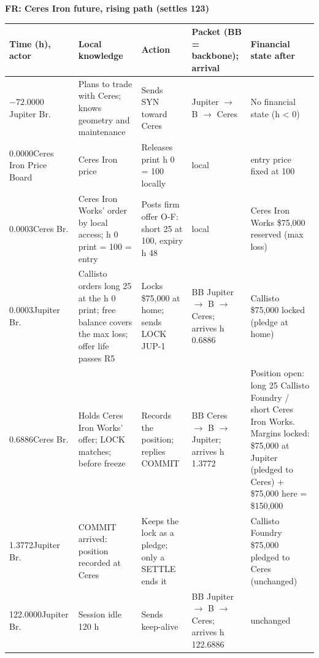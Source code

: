 \medskip
\par\noindent\textbf{FR: Ceres Iron future, rising path (settles 123)}\par
{\setlength{\tabcolsep}{3pt}
\begin{xltabular}{\linewidth}{>{\raggedright\arraybackslash}p{1.75cm}>{\raggedright\arraybackslash{}\hsize}X>{\raggedright\arraybackslash{}\hsize}X>{\raggedright\arraybackslash{}\hsize}X>{\raggedright\arraybackslash{}\hsize}X}
\toprule
Time (h), actor & Local knowledge & Action & Packet (BB = backbone); arrival & Financial state after\\
\midrule
\endhead
\bottomrule
\endlastfoot
\mbox{$-72.0000$}\newline Jupiter Br. & Plans to trade with Ceres; knows geometry and maintenance & Sends SYN toward Ceres & Jupiter $\to$ B $\to$ Ceres & No financial state (h < 0)\\
\mbox{0.0000}\newline Ceres Iron Price Board & Ceres Iron price & Releases print h 0 = 100 locally & local & entry price fixed at 100\\
\mbox{0.0003}\newline Ceres Br. & Ceres Iron Works' order by local access; h 0 print = 100 = entry & Posts firm offer O-F: short 25 at 100, expiry h 48 & local & Ceres Iron Works \$75{,}000 reserved (max loss)\\
\mbox{0.0003}\newline Jupiter Br. & Callisto orders long 25 at the h 0 print; free balance covers the max loss; offer life passes R5 & Locks \$75{,}000 at home; sends LOCK JUP-1 & BB Jupiter $\to$ B $\to$ Ceres; arrives h 0.6886 & Callisto \$75{,}000 locked (pledge at home)\\
\mbox{0.6886}\newline Ceres Br. & Holds Ceres Iron Works' offer; LOCK matches; before freeze & Records the position; replies COMMIT & BB Ceres $\to$ B $\to$ Jupiter; arrives h 1.3772 & Position open: long 25 Callisto Foundry / short Ceres Iron Works. Margins locked: \$75{,}000 at Jupiter (pledged to Ceres) + \$75{,}000 here = \$150{,}000\\
\mbox{1.3772}\newline Jupiter Br. & COMMIT arrived: position recorded at Ceres & Keeps the lock as a pledge; only a SETTLE ends it &  & Callisto Foundry \$75{,}000 pledged to Ceres (unchanged)\\
\mbox{122.0000}\newline Jupiter Br. & Session idle 120 h & Sends keep-alive & BB Jupiter $\to$ B $\to$ Ceres; arrives h 122.6886 & unchanged\\

\end{xltabular}}
